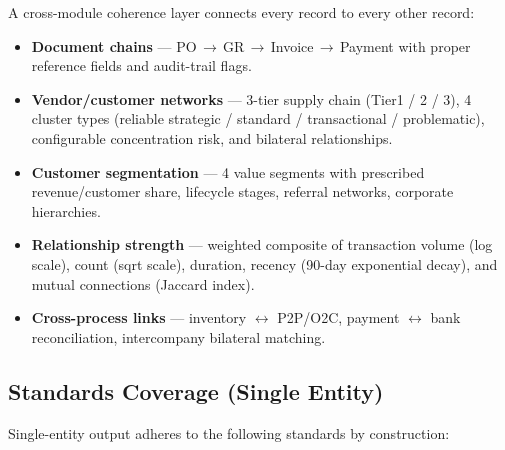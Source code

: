 \documentclass[11pt,a4paper]{article}
\begin{document}
A cross-module coherence layer connects every record to every other record:

\begin{itemize}[leftmargin=1.2em, itemsep=3pt]
  \item \textbf{Document chains} --- PO\,$\to$\,GR\,$\to$\,Invoice\,$\to$\,Payment
        with proper reference fields and audit-trail flags.
  \item \textbf{Vendor/customer networks} --- 3-tier supply chain (Tier1 / 2 / 3),
        4 cluster types (reliable strategic / standard / transactional / problematic),
        configurable concentration risk, and bilateral relationships.
  \item \textbf{Customer segmentation} --- 4 value segments with prescribed
        revenue/customer share, lifecycle stages, referral networks, corporate
        hierarchies.
  \item \textbf{Relationship strength} --- weighted composite of transaction
        volume (log scale), count (sqrt scale), duration, recency
        (90-day exponential decay), and mutual connections (Jaccard index).
  \item \textbf{Cross-process links} --- inventory $\leftrightarrow$ P2P/O2C,
        payment $\leftrightarrow$ bank reconciliation, intercompany bilateral
        matching.
\end{itemize}

\subsection{Standards Coverage (Single Entity)}

Single-entity output adheres to the following standards by construction:
\end{document}
